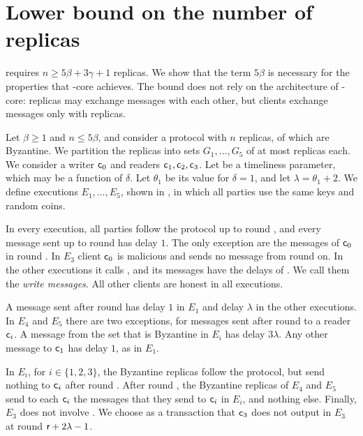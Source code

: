 \section{Lower bound on the number of replicas}\label{app:lower-bound}

 requires $n \geq 5\beta + 3\gamma + 1$ replicas. We
show that the term $5\beta$ is necessary for the properties that \podtm-core
achieves. The bound does not rely on the architecture of \podtm-core: replicas
may exchange messages with each other, but clients exchange messages only with
replicas.

Let $\beta \geq 1$ and $n \leq 5\beta$, and consider a protocol with $n$
replicas, \beta of which are Byzantine. We partition the replicas into sets
$G_1, \ldots, G_5$ of at most \beta replicas each. We consider a writer
$\textsf{c}_0$ and readers $\textsf{c}_1, \textsf{c}_2, \textsf{c}_3$. Let \parTemp be a
timeliness parameter, which may be a function of $\delta$. Let $\theta_1$ be
its value for $\delta = 1$, and let $\lambda = \theta_1 + 2$. We define
executions $E_1, \ldots, E_5$, shown in , in
which all parties use the same keys and random coins.

In every execution, all parties follow the protocol up to round \round, and
every message sent up to round \round has delay $1$. The only exception are the
messages of $\textsf{c}_0$ in round \round. In $E_3$ client $\textsf{c}_0$ is
malicious and sends no message from round \round on. In the other executions it
calls \opwrite{\tx}, and its messages have the delays of
. We call them the \emph{write messages}.  All
other clients are honest in all executions.

A message sent after round \round has delay $1$ in $E_1$ and delay $\lambda$ in
the other executions. In $E_4$ and $E_5$ there are two exceptions, for messages
sent after round \round to a reader $\textsf{c}_i$. A message from the set that is
Byzantine in $E_i$ has delay $3\lambda$. Any other message to $\textsf{c}_1$ has
delay $1$, as in $E_1$.

In $E_i$, for $i \in \{1, 2, 3\}$, the Byzantine replicas follow the protocol,
but send nothing to $\textsf{c}_i$ after round \round. After round \round, the
Byzantine replicas of $E_4$ and $E_5$ send to each $\textsf{c}_i$ the messages that
they send to $\textsf{c}_i$ in $E_i$, and nothing else. Finally, $E_3$ does not
involve \tx. We choose \tx as a transaction that $\textsf{c}_3$ does not output in
$E_3$ at round $\textsf{r} + 2\lambda - 1$.

